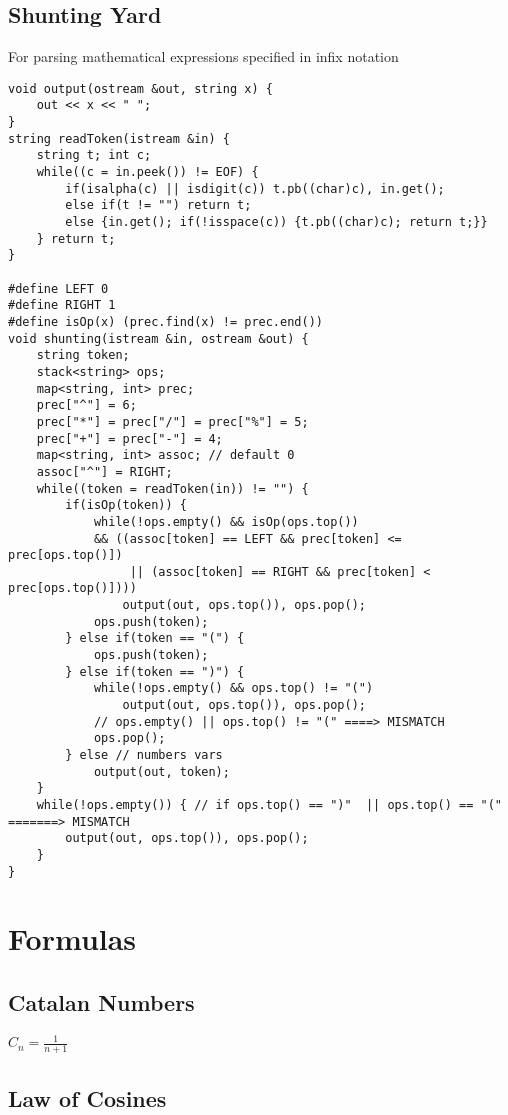 \documentclass[11pt, oneside]{article}
\begin{document}
\subsection{Shunting Yard}
 For parsing mathematical expressions specified in infix notation
\begin{lstlisting}
void output(ostream &out, string x) {
    out << x << " ";
}
string readToken(istream &in) {
    string t; int c;
    while((c = in.peek()) != EOF) {
        if(isalpha(c) || isdigit(c)) t.pb((char)c), in.get();
        else if(t != "") return t;
        else {in.get(); if(!isspace(c)) {t.pb((char)c); return t;}}
    } return t;
}

#define LEFT 0
#define RIGHT 1
#define isOp(x) (prec.find(x) != prec.end())
void shunting(istream &in, ostream &out) {
    string token;
    stack<string> ops;
    map<string, int> prec;
    prec["^"] = 6;
    prec["*"] = prec["/"] = prec["%"] = 5;
    prec["+"] = prec["-"] = 4;
    map<string, int> assoc; // default 0
    assoc["^"] = RIGHT;
    while((token = readToken(in)) != "") {
        if(isOp(token)) {
            while(!ops.empty() && isOp(ops.top())
            && ((assoc[token] == LEFT && prec[token] <= prec[ops.top()]) 
                 || (assoc[token] == RIGHT && prec[token] < prec[ops.top()])))
                output(out, ops.top()), ops.pop();
            ops.push(token);
        } else if(token == "(") {
            ops.push(token);
        } else if(token == ")") {
            while(!ops.empty() && ops.top() != "(")
                output(out, ops.top()), ops.pop();
            // ops.empty() || ops.top() != "(" ====> MISMATCH
            ops.pop();
        } else // numbers vars
            output(out, token);
    }
    while(!ops.empty()) { // if ops.top() == ")"  || ops.top() == "(" =======> MISMATCH
        output(out, ops.top()), ops.pop(); 
    }
}
\end{lstlisting}

\section{Formulas}

\subsection{Catalan Numbers}

$C_n = \frac{1}{n+1}$

\subsection{Law of Cosines}
\end{document}
